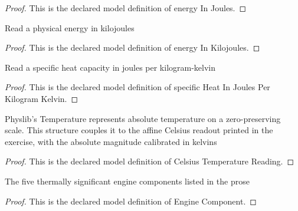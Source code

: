\begin{proof}
  This is the declared model definition of energy In Joules.
\end{proof}
\begin{definition}
  \label{def:physics:phyx-mini-0456:phyxminiproblems-problemphyxmini0456-energyinkilojoules}
  Read a physical energy in kilojoules
\end{definition}
\begin{proof}
  This is the declared model definition of energy In Kilojoules.
\end{proof}
\begin{definition}
  \label{def:physics:phyx-mini-0456:phyxminiproblems-problemphyxmini0456-specificheatinjoulesperkilogramkelvin}
  Read a specific heat capacity in joules per kilogram-kelvin
\end{definition}
\begin{proof}
  This is the declared model definition of specific Heat In Joules Per Kilogram Kelvin.
\end{proof}
\begin{definition}
  \label{def:physics:phyx-mini-0456:phyxminiproblems-problemphyxmini0456-celsiustemperaturereading}
  Physlib's Temperature represents absolute temperature on a zero-preserving scale. This structure couples it to the affine Celsius readout printed in the exercise, with the absolute magnitude calibrated in kelvins
\end{definition}
\begin{proof}
  This is the declared model definition of Celsius Temperature Reading.
\end{proof}
\begin{definition}
  \label{def:physics:phyx-mini-0456:phyxminiproblems-problemphyxmini0456-enginecomponent}
  The five thermally significant engine components listed in the prose
\end{definition}
\begin{proof}
  This is the declared model definition of Engine Component.
\end{proof}
